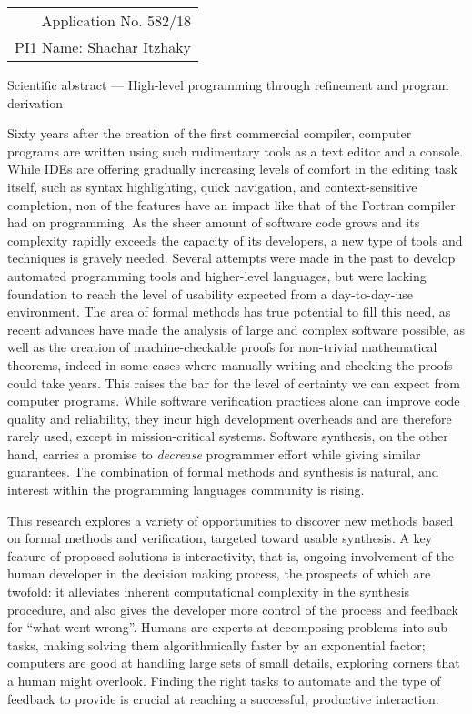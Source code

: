 \documentclass[11pt,a4paper]{article}
\begin{document}
\hfill
\begin{tabular}{r}
Application No. 582/18 \\
PI1 Name: Shachar Itzhaky
\end{tabular}

\medskip\noindent
{%
\fontsize{14pt}{14pt}\selectfont%
Scientific abstract --- High-level programming through refinement and program derivation
}

\medskip
Sixty years after the creation of the first commercial compiler,
computer programs are written using such rudimentary tools as a text
editor and a console.
While IDEs are offering gradually increasing levels of comfort in the
editing task itself, such as syntax highlighting, quick navigation,
and context-sensitive completion, non of the features have an impact
like that of the Fortran compiler had on programming.
As the sheer amount of software code grows and its complexity rapidly
exceeds the capacity of its developers, a new type of tools and techniques
is gravely needed.
Several attempts were made in the past to develop automated programming
tools and higher-level languages, but were lacking foundation to
reach the level of usability expected from a day-to-day-use environment.
The area of formal methods has true potential to fill this need, as
recent advances have made the analysis of large and complex software
possible, as well as the creation of machine-checkable proofs for
non-trivial mathematical theorems, indeed in some cases where manually
writing and checking the proofs could take years.
This raises the bar for the level of certainty we can expect from
computer programs.
While software verification practices alone can improve code quality
and reliability, they incur high development overheads and are therefore
rarely used, except in mission-critical systems.
Software synthesis, on the other hand, carries a promise to \emph{decrease}
programmer effort while giving similar guarantees.
The combination of formal methods and synthesis is natural, and interest
within the programming languages community is rising.

This research explores a variety of opportunities to discover new methods
based on formal methods and verification, targeted toward usable synthesis.
A key feature of proposed solutions is interactivity, that is, ongoing
involvement of the human developer in the decision making process,
the prospects of which are twofold:
it alleviates inherent computational complexity in the synthesis procedure,
and also gives the developer more control of the process and feedback for
``what went wrong''.
Humans are experts at decomposing problems into sub-tasks, making solving
them algorithmically faster by an exponential factor;
computers are good at handling large sets of small details, exploring
corners that a human might overlook.
Finding the right tasks to automate and the type of feedback to provide
is crucial at reaching a successful, productive interaction.
\end{document}
